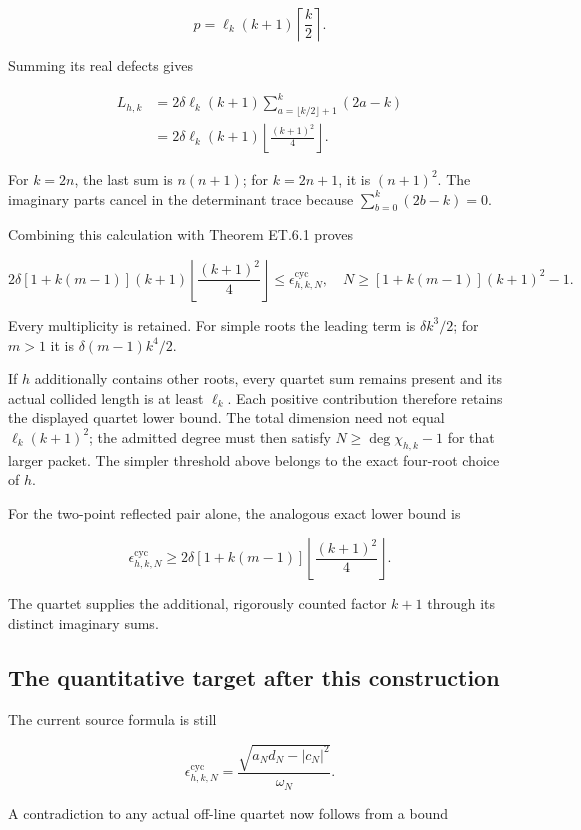 \[
p=\ell_k(k+1)\left\lceil\frac k2\right\rceil.
\]

Summing its real defects gives

\[
\begin{aligned}
L_{h,k}
&=2\delta\ell_k(k+1)
\sum_{a=\lfloor k/2\rfloor+1}^{k}(2a-k)\\
&=2\delta\ell_k(k+1)
\left\lfloor\frac{(k+1)^2}{4}\right\rfloor.
\end{aligned}
\]

For \(k=2n\), the last sum is \(n(n+1)\); for \(k=2n+1\), it is
\((n+1)^2\). The imaginary parts cancel in the determinant trace because
\(\sum_{b=0}^k(2b-k)=0\).

Combining this calculation with Theorem ET.6.1 proves

\[
\boxed{
2\delta[1+k(m-1)](k+1)
\left\lfloor\frac{(k+1)^2}{4}\right\rfloor
\leq\epsilon_{h,k,N}^{\mathrm{cyc}},
\quad N\geq[1+k(m-1)](k+1)^2-1.
}
\]

Every multiplicity is retained. For simple roots the leading term is
\(\delta k^3/2\); for \(m>1\) it is \(\delta(m-1)k^4/2\).

If \(h\) additionally contains other roots, every quartet sum remains
present and its actual collided length is at least \(\ell_k\).
Each positive contribution therefore retains the displayed quartet
lower bound. The total dimension need not equal \(\ell_k(k+1)^2\);
the admitted degree must then satisfy \(N\geq\deg\chi_{h,k}-1\)
for that larger packet. The simpler threshold above belongs to the exact
four-root choice of \(h\).

For the two-point reflected pair alone, the analogous exact lower bound
is

\[
\epsilon_{h,k,N}^{\mathrm{cyc}}
\geq2\delta[1+k(m-1)]
\left\lfloor\frac{(k+1)^2}{4}\right\rfloor.
\]

The quartet supplies the additional, rigorously counted factor \(k+1\)
through its distinct imaginary sums.

\subsection{The quantitative target after this
construction}\label{exttrace-the-quantitative-target-after-this-construction}

The current source formula is still

\[
\epsilon_{h,k,N}^{\mathrm{cyc}}
=\frac{\sqrt{a_Nd_N-|c_N|^2}}{\omega_N}.
\]

A contradiction to any actual off-line quartet now follows from a bound

